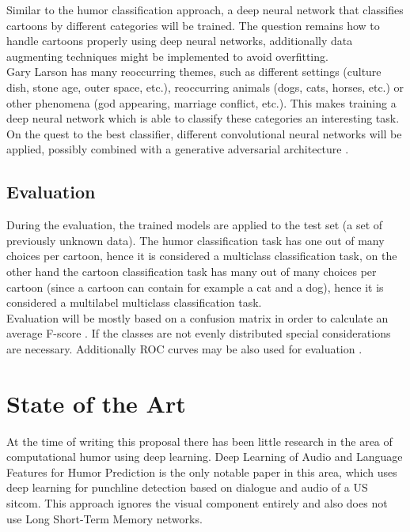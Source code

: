 \documentclass[draft,final,oneside]{vutinfth} %
\begin{document}
Similar to the humor classification approach, a deep neural network that classifies cartoons by different categories will be trained. The question remains how to handle cartoons properly using deep neural networks, additionally data augmenting techniques might be implemented to avoid overfitting. \\

Gary Larson has many reoccurring themes, such as different settings (culture dish, stone age, outer space, etc.), reoccurring animals (dogs, cats, horses, etc.) or other phenomena (god appearing, marriage conflict, etc.). This makes training a deep neural network which is able to classify these categories an interesting task. On the quest to the best classifier, different convolutional neural networks will be applied, possibly combined with a generative adversarial architecture \cite{gan2}\cite{gan}.

\section {Evaluation}

During the evaluation, the trained models are applied to the test set (a set of previously unknown data). The humor classification task has one out of many choices per cartoon, hence it is considered a multiclass classification task, on the other hand the cartoon classification task has many out of many choices per cartoon (since a cartoon can contain for example a cat and a dog), hence it is considered a multilabel multiclass classification task. \\

Evaluation will be mostly based on a confusion matrix in order to calculate an average F-score \cite{Powers2008EvaluationFP}. If the classes are not evenly distributed special considerations are necessary. Additionally ROC curves may be also used for evaluation \cite{Hand2001}. 

\chapter{State of the Art}

At the time of writing this proposal there has been little research in the area of computational humor using deep learning. Deep Learning of Audio and Language Features for Humor Prediction \cite{Bertero2016DeepLO} is the only notable paper in this area, which uses deep learning for punchline detection based on dialogue and audio of a US sitcom. This approach ignores the visual component entirely and also does not use Long Short-Term Memory networks.
\end{document}
